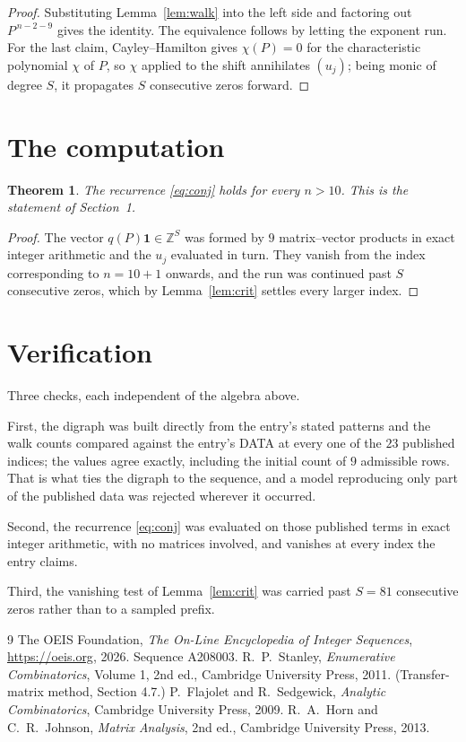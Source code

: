 \documentclass[11pt,a4paper]{article}
\theoremstyle{plain}
\newtheorem{theorem}{Theorem}
\theoremstyle{definition}
\begin{document}
\begin{proof}
Substituting Lemma~\ref{lem:walk} into the left side and factoring out
$P^{\,n-2-9}$ gives the identity. The equivalence follows by letting the exponent
run. For the last claim, Cayley--Hamilton gives $\chi(P)=0$ for the characteristic
polynomial $\chi$ of $P$, so $\chi$ applied to the shift annihilates $(u_j)$; being monic of
degree $S$, it propagates $S$ consecutive zeros forward.
\end{proof}

\section{The computation}

\begin{theorem}
The recurrence \eqref{eq:conj} holds for every $n>10$. This is the statement of
Section~1.
\end{theorem}

\begin{proof}
The vector $q(P)\mathbf{1}\in\mathbb{Z}^{S}$ was formed by $9$ matrix--vector
products in exact integer arithmetic and the $u_j$ evaluated in turn. They vanish from the
index corresponding to $n=10+1$ onwards, and the run was continued past $S$ consecutive
zeros, which by Lemma~\ref{lem:crit} settles every larger index.
\end{proof}

\section{Verification}

Three checks, each independent of the algebra above.

First, the digraph was built directly from the entry's stated patterns and the walk counts
compared against the entry's DATA at every one of the $23$ published indices; the
values agree exactly, including the initial count of $9$ admissible rows. That is
what ties the digraph to the sequence, and a model reproducing only part of the published
data was rejected wherever it occurred.

Second, the recurrence \eqref{eq:conj} was evaluated on those published terms in exact
integer arithmetic, with no matrices involved, and vanishes at every index the entry claims.

Third, the vanishing test of Lemma~\ref{lem:crit} was carried past $S=81$ consecutive
zeros rather than to a sampled prefix.

\begin{thebibliography}{9}
 The OEIS Foundation, \emph{The On-Line Encyclopedia of Integer
Sequences}, \url{https://oeis.org}, 2026. Sequence A208003.
 R.~P.~Stanley, \emph{Enumerative Combinatorics}, Volume 1, 2nd ed.,
Cambridge University Press, 2011. (Transfer-matrix method, Section 4.7.)
 P.~Flajolet and R.~Sedgewick, \emph{Analytic Combinatorics}, Cambridge
University Press, 2009.
 R.~A.~Horn and C.~R.~Johnson, \emph{Matrix Analysis}, 2nd ed., Cambridge
University Press, 2013.
\end{thebibliography}
\end{document}
